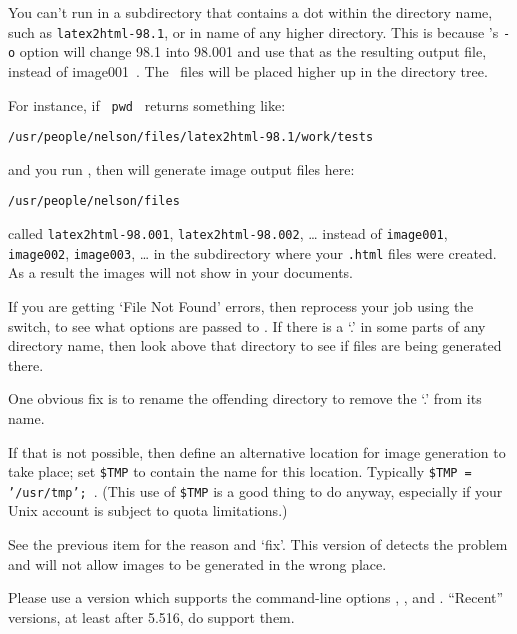 \begin{htmllist}
\begin{changebar}
\item [It does not show any of your images: ]
  You can't run \latextohtml{} in a subdirectory that contains a dot
  within the directory name, such as {\tt latex2html-98.1},
  or in name of any higher directory.
  This is because 's \texttt{-o} option will change 98.1 into 98.001
  and use that as the resulting output file, instead of image001~.
  The \PS\ files will be placed higher up in the directory tree.

For instance, if \texttt{ pwd } returns something like:
\begin{verbatim}
/usr/people/nelson/files/latex2html-98.1/work/tests
\end{verbatim}
and you run \latextohtml, then  will generate
image output files here:
\begin{verbatim}
/usr/people/nelson/files
\end{verbatim}
  called \texttt{latex2html-98.001}, \texttt{latex2html-98.002}, \dots
  instead of \texttt{image001}, \texttt{image002}, \texttt{image003}, \dots
  in the subdirectory where your \texttt{.html} files were created.
  As a result the images will not show in your documents.

  If you are getting `File Not Found' errors,
  then reprocess your job using the  switch,
  to see what options are passed to .
  If there is a `.' in some parts of any directory name,
  then look above that directory
  to see if files are being generated there.

\medskip

  One obvious fix is to rename the offending directory
  to remove the `.' from its name.

  If that is not possible, then define an alternative location
  for image generation to take place; set \texttt{\$TMP} to contain
  the name for this location. Typically \texttt{\$TMP = '/usr/tmp';}~.
  (This use of \texttt{\$TMP} is a good thing to do anyway,
  especially if your Unix account is subject to quota limitations.)

\item [It stops after having run \LaTeX, displaying a message about \fn{dvips}: ]
  See the previous item for the reason and `fix'.
  This version of \latextohtml{} detects the problem
  and will not allow images to be generated in the wrong place.
\end{changebar}

\item [\fn{dvips} complains about incorrect arguments:\label{dvips} ]
Please use a version which supports the command-line options , ,
 and . ``Recent'' versions, at least after 5.516, do support them.



\end{htmllist}
